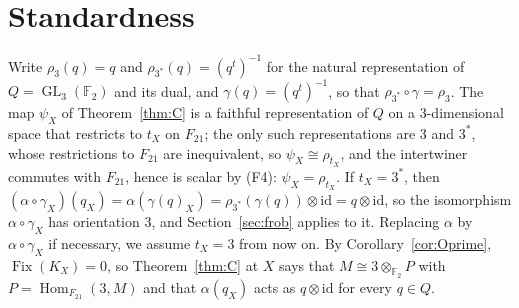 \documentclass[11pt]{amsart}
\theoremstyle{remark}
\newcommand{\F}{\mathbb F}
\newcommand{\GL}{\operatorname{GL}}
\newcommand{\Fix}{\operatorname{Fix}}
\newcommand{\Hom}{\operatorname{Hom}}
\begin{document}
\section{Standardness}\label{sec:standard}

Write $\rho_3(q)=q$ and $\rho_{3^*}(q)=(q^t)^{-1}$ for the natural
representation of $Q=\GL_3(\F_2)$ and its dual, and $\gamma(q)=(q^t)^{-1}$,
so that $\rho_{3^*}\circ\gamma=\rho_3$. The map $\psi_X$ of
Theorem~\ref{thm:C} is a faithful representation of $Q$ on a
$3$-dimensional space that restricts to $t_X$ on $F_{21}$; the only such
representations are $3$ and $3^*$, whose restrictions to $F_{21}$ are
inequivalent, so $\psi_X\cong\rho_{t_X}$, and the intertwiner commutes with
$F_{21}$, hence is scalar by (F4): $\psi_X=\rho_{t_X}$. If $t_X=3^*$, then
$(\alpha\circ\gamma_X)(q_X)=\alpha(\gamma(q)_X)=\rho_{3^*}(\gamma(q))\otimes\mathrm{id}
=q\otimes\mathrm{id}$, so the isomorphism $\alpha\circ\gamma_X$ has
orientation $3$, and Section~\ref{sec:frob} applies to it. Replacing
$\alpha$ by $\alpha\circ\gamma_X$ if necessary, we assume $t_X=3$ from now
on. By Corollary~\ref{cor:Oprime}, $\Fix(K_X)=0$, so Theorem~\ref{thm:C}
at $X$ says that $M\cong3\otimes_{\F_2}P$ with $P=\Hom_{F_{21}}(3,M)$ and
that $\alpha(q_X)$ acts as $q\otimes\mathrm{id}$ for every $q\in Q$.
\end{document}
